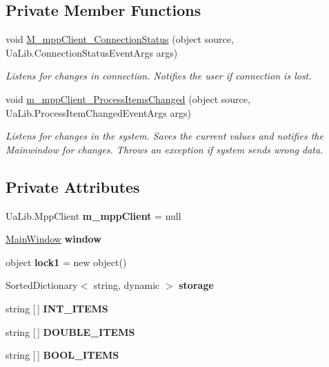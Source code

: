 \subsection*{Private Member Functions}
\begin{DoxyCompactItemize}
\item 
void \hyperlink{class_a_s_e6030_1_1_listener_ab7cab9e2e9a1a2bbec9f2d8be25411b1}{M\+\_\+mpp\+Client\+\_\+\+Connection\+Status} (object source, Ua\+Lib.\+Connection\+Status\+Event\+Args args)
\begin{DoxyCompactList}\small\item\em Listens for changes in connection. Notifies the user if connection is lost. \end{DoxyCompactList}\item 
void \hyperlink{class_a_s_e6030_1_1_listener_a215911bec08fdd4671b17ad9a13944f2}{m\+\_\+mpp\+Client\+\_\+\+Process\+Items\+Changed} (object source, Ua\+Lib.\+Process\+Item\+Changed\+Event\+Args args)
\begin{DoxyCompactList}\small\item\em Listens for changes in the system. Saves the current values and notifies the Mainwindow for changes. Throws an exception if system sends wrong data. \end{DoxyCompactList}\end{DoxyCompactItemize}
\subsection*{Private Attributes}
\begin{DoxyCompactItemize}
\item 
\mbox{\label{class_a_s_e6030_1_1_listener_ab65acfa466bc3499bf3520c7130e9260}} 
Ua\+Lib.\+Mpp\+Client {\bfseries m\+\_\+mpp\+Client} = null
\item 
\mbox{\label{class_a_s_e6030_1_1_listener_a50847f3c491f4bc625bb38affa5a5113}} 
\hyperlink{class_a_s_e6030_1_1_main_window}{Main\+Window} {\bfseries window}
\item 
\mbox{\label{class_a_s_e6030_1_1_listener_a970d9378d34696b4a2e43dca533c1d16}} 
object {\bfseries lock1} = new object()
\item 
\mbox{\label{class_a_s_e6030_1_1_listener_a781198abefa16de65e4d5e4d8b97e08a}} 
Sorted\+Dictionary$<$ string, dynamic $>$ {\bfseries storage}
\item 
string \mbox{[}$\,$\mbox{]} {\bfseries I\+N\+T\+\_\+\+I\+T\+E\+MS}
\item 
string \mbox{[}$\,$\mbox{]} {\bfseries D\+O\+U\+B\+L\+E\+\_\+\+I\+T\+E\+MS}
\item 
string \mbox{[}$\,$\mbox{]} {\bfseries B\+O\+O\+L\+\_\+\+I\+T\+E\+MS}
\end{DoxyCompactItemize}


